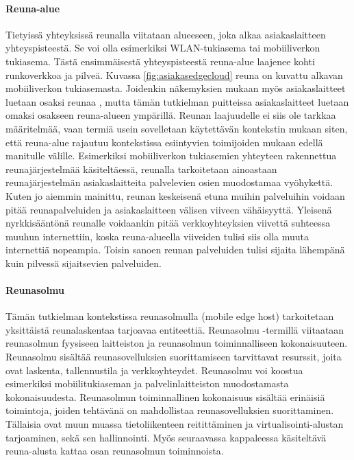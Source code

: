 \paragraph{Reuna-alue} 
Tietyissä yhteyksissä reunalla viitataan alueeseen, joka alkaa asiakaslaitteen yhteyspisteestä. Se voi olla esimerkiksi WLAN-tukiasema tai mobiiliverkon tukiasema. Tästä ensimmäisestä yhteyspisteestä reuna-alue laajenee kohti runkoverkkoa ja pilveä.
Kuvassa \ref{fig:asiakasedgecloud} reuna on kuvattu alkavan mobiiliverkon tukiasemasta.
Joidenkin näkemyksien mukaan myös asiakaslaitteet luetaan osaksi reunaa \cite{garcia}, mutta tämän tutkielman puitteissa asiakaslaitteet luetaan omaksi osakseen reuna-alueen ympärillä.
Reunan laajuudelle ei siis ole tarkkaa määritelmää, vaan termiä usein sovelletaan käytettävän kontekstin mukaan siten, että reuna-alue rajautuu kontekstissa esiintyvien toimijoiden mukaan edellä manitulle välille.
Esimerkiksi mobiiliverkon tukiasemien yhteyteen rakennettua reunajärjestelmää käsiteltäessä, reunalla tarkoitetaan ainoastaan reunajärjestelmän asiakaslaitteita palvelevien osien muodostamaa vyöhykettä. 
Kuten jo aiemmin mainittu, reunan keskeisenä etuna muihin palveluihin voidaan pitää reunapalveluiden ja asiakaslaitteen välisen viiveen vähäisyyttä.
Yleisenä nyrkkisääntönä reunalle voidaankin pitää verkkoyhteyksien viivettä suhteessa muuhun internettiin, koska reuna-alueella viiveiden tulisi siis olla muuta internettiä nopeampia. Toisin sanoen reunan palveluiden tulisi sijaita lähempänä kuin pilvessä sijaitsevien palveluiden.


\paragraph{Reunasolmu} 
Tämän tutkielman kontekstissa reunasolmulla (mobile edge host) tarkoitetaan yksittäistä reunalaskentaa tarjoavaa entiteettiä\cite{etsirefarch}.
Reunasolmu -termillä viitaataan reunasolmun fyysiseen laitteiston ja reunasolmun toiminnalliseen kokonaisuuteen.
Reunasolmu sisältää reunasovelluksien suorittamiseen tarvittavat resurssit, joita ovat laskenta, tallennustila ja verkkoyhteydet.
Reunasolmu voi koostua esimerkiksi mobiilitukiaseman ja palvelinlaitteiston muodostamasta kokonaisuudesta. 
Reunasolmun toiminnallinen kokonaisuus sisältää erinäisiä toimintoja, joiden tehtävänä on mahdollistaa reunasovelluksien suorittaminen. Tällaisia ovat muun muassa tietoliikenteen reitittäminen ja virtualisointi-alustan tarjoaminen, sekä sen hallinnointi. Myös seuraavassa kappaleessa käsiteltävä reuna-alusta kattaa osan reunasolmun toiminnoista.

